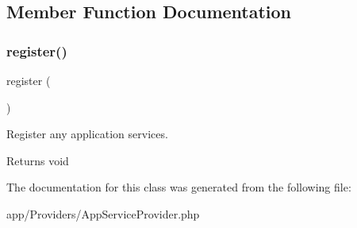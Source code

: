 \subsection{Member Function Documentation}
\mbox{\label{class_app_1_1_providers_1_1_app_service_provider_acc294a6cc8e69743746820e3d15e3f78}} 
\subsubsection{\texorpdfstring{register()}{register()}}
{\footnotesize\ttfamily register (\begin{DoxyParamCaption}{ }\end{DoxyParamCaption})}

Register any application services.

\begin{DoxyReturn}{Returns}
void 
\end{DoxyReturn}


The documentation for this class was generated from the following file\+:\begin{DoxyCompactItemize}
\item 
app/\+Providers/App\+Service\+Provider.\+php\end{DoxyCompactItemize}
